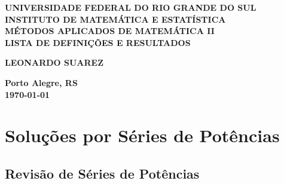 \documentclass{article}
\theoremstyle{plain}
\theoremstyle{definition}
\theoremstyle{remark}
\begin{document}
\begin{center}
    \textbf{\large UNIVERSIDADE FEDERAL DO RIO GRANDE DO SUL} \\
    \textbf{\large INSTITUTO DE MATEMÁTICA E ESTATÍSTICA} \\
    \vspace{3cm}
    \textbf{\Large MÉTODOS APLICADOS DE MATEMÁTICA II} \\
    \vspace{1cm}
    \textbf{\large LISTA DE DEFINIÇÕES E RESULTADOS} \\
    \vspace{3cm}

    \textbf{LEONARDO SUAREZ}

    \vfill
    \textbf{\large Porto Alegre, RS} \\
    \textbf{\large \today}
\end{center}

\newpage
\tableofcontents
\newpage

\section{Soluções por Séries de Potências}

\subsection{Revisão de Séries de Potências}
\end{document}
